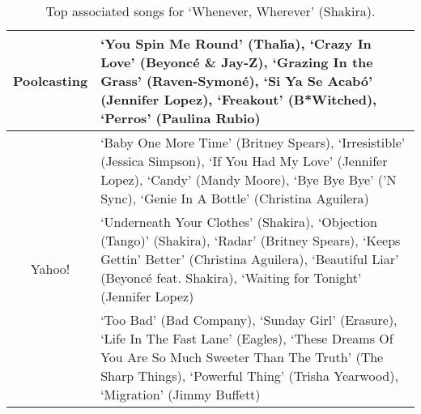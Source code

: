 \begin{table}[bthp]\centering
\setlength{\extrarowheight}{3pt}
\setlength{\abovecaptionskip}{3pt}
\setlength{\belowcaptionskip}{3pt}
\caption{Top associated songs for `Whenever, Wherever' (Shakira).}\label{table:samplerelevance2}
{\fontsize{8}{10}\selectfont\begin{tabular}{|c|p{}|}
 \hline
 \multirow{3}{*}{Poolcasting} &
 `You Spin Me Round' (Thal\'{\i}a), `Crazy In Love' (Beyonc\'{e} \& Jay-Z), `Grazing In the Grass' (Raven-Symon\'{e}), `Si Ya Se Acab\'{o}' (Jennifer Lopez), `Freakout' (B*Witched), `Perros' (Paulina Rubio) \vspace{2pt} \\ 
 \hline
 \multirow{3}{*}{Yahoo!} &
 `Baby One More Time'	(Britney Spears), `Irresistible'	(Jessica Simpson), `If You Had My Love' (Jennifer Lopez), `Candy'	(Mandy Moore), `Bye Bye Bye'	('N Sync), `Genie In A Bottle' (Christina Aguilera) \vspace{2pt} \\
 \hline
 \multirow{3}{*}{Last.fm} &
 `Underneath Your Clothes'	(Shakira), `Objection (Tango)'	(Shakira), `Radar' (Britney Spears), `Keeps Gettin' Better'	(Christina Aguilera), `Beautiful Liar'	(Beyonc\'{e} feat. Shakira), `Waiting for Tonight' (Jennifer Lopez) \vspace{2pt} \\
 \hline
 \multirow{3}{*}{Audiobaba} &
 `Too Bad'	(Bad Company), `Sunday Girl'	(Erasure), `Life In The Fast Lane' (Eagles), `These Dreams Of You Are So Much Sweeter Than The Truth'	(The Sharp Things), `Powerful Thing'	(Trisha Yearwood), `Migration' (Jimmy Buffett) \vspace{2pt} \\
 \hline
\end{tabular}}
\end{table}
